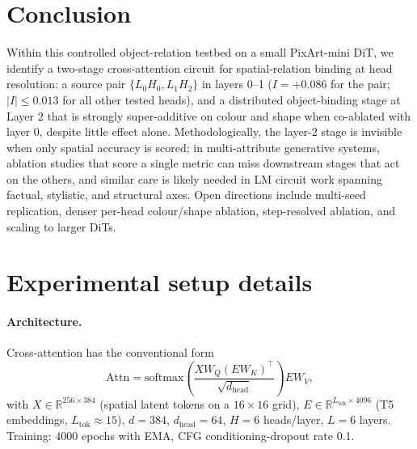 \documentclass{article}
\theoremstyle{plain}
\theoremstyle{definition}
\begin{document}
\section{Conclusion}

Within this controlled object-relation testbed on a small PixArt-mini DiT, we identify a two-stage cross-attention circuit for spatial-relation binding at head resolution: a source pair $\{L_0H_0, L_1H_2\}$ in layers 0--1 ($I = +0.086$ for the pair; $|I| \leq 0.013$ for all other tested heads), and a distributed object-binding stage at Layer 2 that is strongly super-additive on colour and shape when co-ablated with layer 0, despite little effect alone. Methodologically, the layer-2 stage is invisible when only spatial accuracy is scored; in multi-attribute generative systems, ablation studies that score a single metric can miss downstream stages that act on the others, and similar care is likely needed in LM circuit work spanning factual, stylistic, and structural axes. Open directions include multi-seed replication, denser per-head colour/shape ablation, step-resolved ablation, and scaling to larger DiTs.





\newpage
\appendix
\onecolumn

\section{Experimental setup details}
\label{app:setup}

\paragraph{Architecture.} Cross-attention has the conventional form
\begin{equation}
\mathrm{Attn} = \mathrm{softmax}\!\left(\frac{XW_Q (EW_K)^\top}{\sqrt{d_\text{head}}}\right) EW_V,
\end{equation}
with $X\!\in\!\mathbb{R}^{256\times 384}$ (spatial latent tokens on a $16{\times}16$ grid), $E\!\in\!\mathbb{R}^{L_\text{tok}\times 4096}$ (T5 embeddings, $L_\text{tok}\!\approx\!15$), $d{=}384$, $d_\text{head}{=}64$, $H{=}6$ heads/layer, $L{=}6$ layers. Training: 4000 epochs with EMA, CFG conditioning-dropout rate 0.1.
\end{document}
